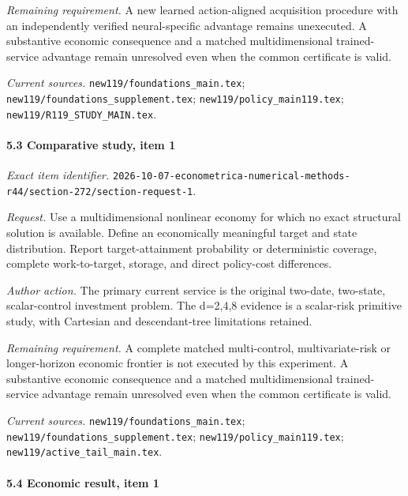 \par\emph{Remaining requirement.} A new learned action-aligned acquisition procedure with an independently verified neural-specific advantage remains unexecuted. A substantive economic consequence and a matched multidimensional trained-service advantage remain unresolved even when the common certificate is valid.

\par\emph{Current sources.} \nolinkurl{new119/foundations_main.tex}; \nolinkurl{new119/foundations_supplement.tex}; \nolinkurl{new119/policy_main119.tex}; \nolinkurl{new119/R119_STUDY_MAIN.tex}.

\paragraph{5.3 Comparative study, item 1}

\emph{Exact item identifier.} \nolinkurl{2026-10-07-econometrica-numerical-methods-r44/section-272/section-request-1}.

\par\emph{Request.} Use a multidimensional nonlinear economy for which no exact structural solution is available. Define an economically meaningful target and state distribution. Report target-attainment probability or deterministic coverage, complete work-to-target, storage, and direct policy-cost differences.

\par\emph{Author action.} The primary current service is the original two-date, two-state, scalar-control investment problem. The d=2,4,8 evidence is a scalar-risk primitive study, with Cartesian and descendant-tree limitations retained.

\par\emph{Remaining requirement.} A complete matched multi-control, multivariate-risk or longer-horizon economic frontier is not executed by this experiment. A substantive economic consequence and a matched multidimensional trained-service advantage remain unresolved even when the common certificate is valid.

\par\emph{Current sources.} \nolinkurl{new119/foundations_main.tex}; \nolinkurl{new119/foundations_supplement.tex}; \nolinkurl{new119/policy_main119.tex}; \nolinkurl{new119/active_tail_main.tex}.

\paragraph{5.4 Economic result, item 1}

